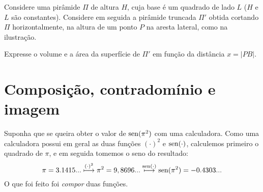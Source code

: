 \begin{exo}

Considere uma pirâmide $\Pi$ de altura $H$, cuja base é um quadrado de
lado $L$ ($H$ e $L$ são constantes). Considere em seguida a pirâmide truncada $\Pi'$
obtida cortando $\Pi$ horizontalmente, na altura de um ponto 
$P$ na aresta lateral, como na ilustração. 
\begin{center}
\begin{bmlimage}\end{bmlimage}
\end{center}
Expresse o volume e a área da superfície de $\Pi'$ em função da distância $x=|PB|$.
\end{exo}

\section{Composição, contradomínio e imagem}

Suponha que se queira obter o valor de $\operatorname{sen} (\pi^2)$ com uma
calculadora. Como uma calculadora possui em geral as duas funções
$(\cdot)^2$ e $\operatorname{sen}(\cdot)$, calculemos primeiro o quadrado de $\pi$, e
em seguida tomemos o seno do resultado:
\[
\pi=3.1415...\stackrel{(\cdot)^2}{\longmapsto} \pi^2=9,8696...
\stackrel{\operatorname{sen}(\cdot)}{\longmapsto} 
\operatorname{sen}(\pi^2)=-0.4303...
\]
O que foi feito foi \emph{compor} duas funções.\\

